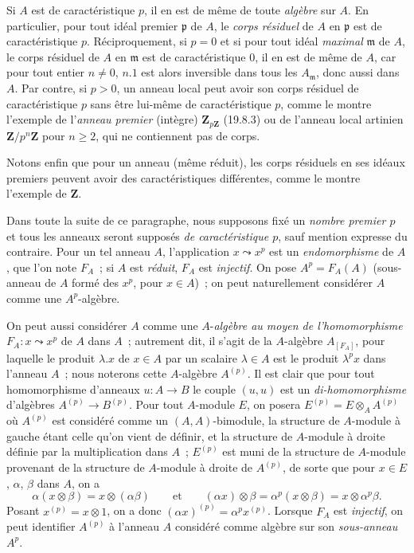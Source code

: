 \begin{env}[21.1.3]
\label{0.21.1.3-fr}
Si $A$ est de caractéristique $p$, il en est de même de toute \emph{algèbre} sur
$A$. En particulier, pour tout idéal premier $\mathfrak p$ de $A$, le \emph{corps
résiduel} de $A$ en $\mathfrak p$ est de caractéristique $p$. Réciproquement,
si $p=0$ et si pour tout idéal \emph{maximal} $\mathfrak m$ de $A$, le corps
résiduel de $A$ en $\mathfrak m$ est de caractéristique $0$, il en est de même
de $A$, car pour tout entier $n\neq0$, $n.1$ est alors inversible dans
tous les $A_{\mathfrak m}$, donc aussi dans $A$. Par contre, si $p>0$, un
anneau local peut avoir son corps résiduel de caractéristique $p$ sans être
lui-même de caractéristique $p$, comme le montre l'exemple de l'\emph{anneau
premier} (intègre) $\mathbf Z_{p\mathbf Z}$ (19.8.3) ou de l'anneau local artinien
$\mathbf Z/p^n\mathbf Z$ pour $n\geq2$, qui ne contiennent pas de corps.

Notons enfin que pour un anneau (même réduit), les corps résiduels en ses
idéaux premiers peuvent avoir des caractéristiques différentes, comme le
montre l'exemple de $\mathbf Z$.
\end{env}

\begin{env}[21.1.4]
\label{0.21.1.4-fr}
Dans toute la suite de ce paragraphe, nous supposons fixé un \emph{nombre premier
$p$} et tous les anneaux seront supposés \emph{de caractéristique $p$}, sauf mention
expresse du contraire. Pour un tel anneau $A$, l'application $x\leadsto x^p$
est un \emph{endomorphisme} de $A$, que l'on note $F_A$~; si $A$ est \emph{réduit}, $F_A$
est \emph{injectif}. On pose $A^p=F_A(A)$ (sous-anneau de $A$ formé des $x^p$,
pour $x\in A$)~; on peut naturellement considérer $A$ comme une $A^p$-algèbre.

On peut aussi considérer $A$ comme une $A$-\emph{algèbre au moyen de
l'homomorphisme} $F_A:x\leadsto x^p$ de $A$ dans $A$~; autrement dit, il
s'agit de la $A$-algèbre $A_{[F_A]}$, pour laquelle le produit $\lambda.x$ de
$x\in A$ par un scalaire $\lambda\in A$ est le produit $\lambda^p x$ dans
l'anneau $A$~; nous noterons cette $A$-algèbre $A^{(p)}$. Il est clair que pour tout homomorphisme d'anneaux $u:A\to B$
le couple $(u,u)$ est un \emph{di-homomorphisme} d'algèbres $A^{(p)}\to B^{(p)}$.
Pour tout $A$-module $E$, on posera $E^{(p)}=E\otimes_A A^{(p)}$ où
$A^{(p)}$ est considéré comme un $(A,A)$-bimodule, la structure de
$A$-module à gauche étant celle qu'on vient de définir, et la structure de
$A$-module à droite définie par la multiplication dans $A$~; $E^{(p)}$ est muni de la structure de $A$-module provenant de la structure de $A$-module à droite de $A^{(p)}$, de sorte que pour
$x\in E$, $\alpha$, $\beta$ dans $A$, on a
\[
  \alpha(x\otimes\beta)=x\otimes(\alpha\beta)\qquad\text{et}\qquad
  (\alpha x)\otimes\beta=\alpha^p(x\otimes\beta)=x\otimes\alpha^p\beta.
\]
Posant $x^{(p)}=x\otimes1$, on a donc $(\alpha x)^{(p)}=\alpha^p x^{(p)}$.
Lorsque $F_A$ est \emph{injectif}, on peut identifier $A^{(p)}$ à l'anneau $A$
considéré comme algèbre sur son \emph{sous-anneau} $A^p$.
\end{env}

